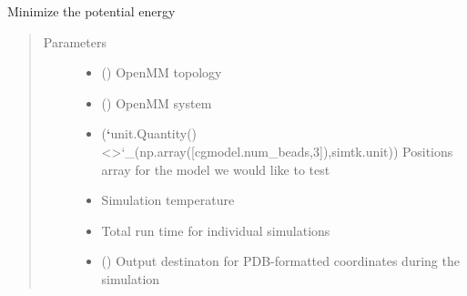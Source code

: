 \documentclass[letterpaper,12pt,english,openany,oneside]{sphinxmanual}
\begin{document}
\begin{fulllineitems}
\label{\detokenize{simulation:simulation.tools.minimize_structure}}
Minimize the potential energy
\begin{quote}\begin{description}
\item[{Parameters}] \leavevmode\begin{itemize}
\item {} 
 (\sphinxstyleliteralemphasis{\sphinxupquote{(}}\sphinxstyleliteralemphasis{\sphinxupquote{)}}) \textendash{} OpenMM topology

\item {} 
 (\sphinxstyleliteralemphasis{\sphinxupquote{(}}\sphinxstyleliteralemphasis{\sphinxupquote{)}}) \textendash{} OpenMM system

\item {} 
 ({\color{red}\bfseries{}{}`}unit.Quantity() \textless{}\textgreater{}{}`\_(np.array({[}cgmodel.num\_beads,3{]}),simtk.unit)) \textendash{} Positions array for the model we would like to test

\item {} 
 \textendash{} Simulation temperature

\item {} 
 \textendash{} Total run time for individual simulations

\item {} 
 () \textendash{} Output destinaton for PDB-formatted coordinates during the simulation


\end{itemize}
\end{description}
\end{quote}
\end{fulllineitems}
\end{document}
